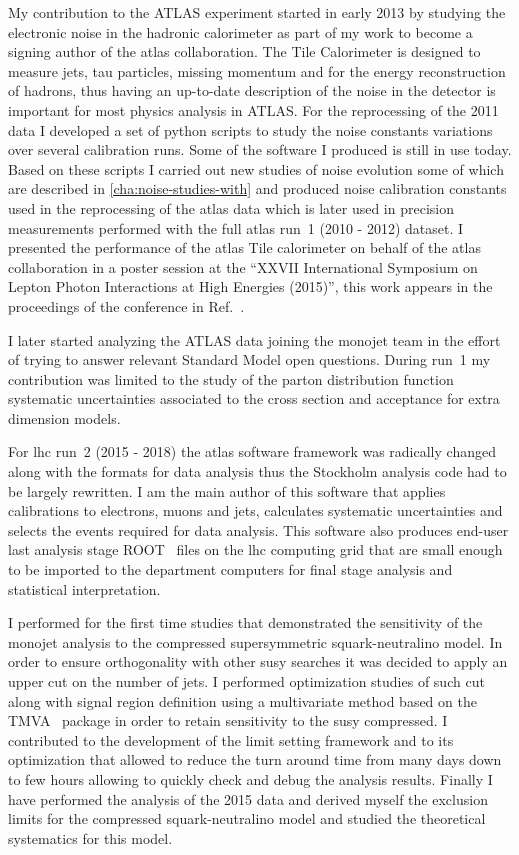 My contribution to the ATLAS experiment started in early 2013 by studying the
electronic noise in the hadronic calorimeter as part of my work to become a
signing author of the \gls{atlas} collaboration. The Tile Calorimeter is
designed to measure jets, tau particles, missing momentum and for the energy
reconstruction of hadrons, thus having an up-to-date description of the noise in
the detector is important for most physics analysis in ATLAS\@. For the
reprocessing of the 2011 data I developed a set of python scripts to study the
noise constants variations over several calibration runs. Some of the software I
produced is still in use today. Based on these scripts I carried out new studies
of noise evolution some of which are described in \cref{cha:noise-studies-with}
and produced noise calibration constants used in the reprocessing of the
\gls{atlas} data which is later used in precision measurements performed with
the full \gls{atlas} run~1 (2010 - 2012) dataset. I presented the performance of
the \gls{atlas} Tile calorimeter on behalf of the \gls{atlas} collaboration in a
poster session at the ``XXVII International Symposium on Lepton Photon
Interactions at High Energies (2015)'', this work appears in the proceedings of
the conference in Ref.~\cite{TileCalPerformanceBertoli}.

I later started analyzing the ATLAS data joining the monojet team in the effort
of trying to answer relevant Standard Model open questions. During run~1 my
contribution was limited to the study of the parton distribution function
systematic uncertainties associated to the cross section and acceptance for
extra dimension models.

For \gls{lhc} run~2 (2015 - 2018) the \gls{atlas} software framework was
radically changed along with the formats for data analysis thus the Stockholm
analysis code had to be largely rewritten. I am the main author of this software
that applies calibrations to electrons, muons and jets, calculates systematic
uncertainties and selects the events required for data analysis. This software
also produces end-user last analysis stage ROOT~\cite{CERNROOT} files on the
\gls{lhc} computing grid that are small enough to be imported to the department
computers for final stage analysis and statistical interpretation.

I performed for the first time studies that demonstrated the sensitivity of the
monojet analysis to the compressed supersymmetric squark-neutralino model. In
order to ensure orthogonality with other \gls{susy} searches it was decided to
apply an upper cut on the number of jets. I performed optimization studies of
such cut along with signal region definition using a multivariate method based
on the TMVA~\cite{TMVA} package in order to retain sensitivity to the \gls{susy}
compressed. I contributed to the development of the limit setting framework and
to its optimization that allowed to reduce the turn around time from many days
down to few hours allowing to quickly check and debug the analysis
results. Finally I have performed the analysis of the 2015 data and derived
myself the exclusion limits for the compressed squark-neutralino model and
studied the theoretical systematics for this model.

